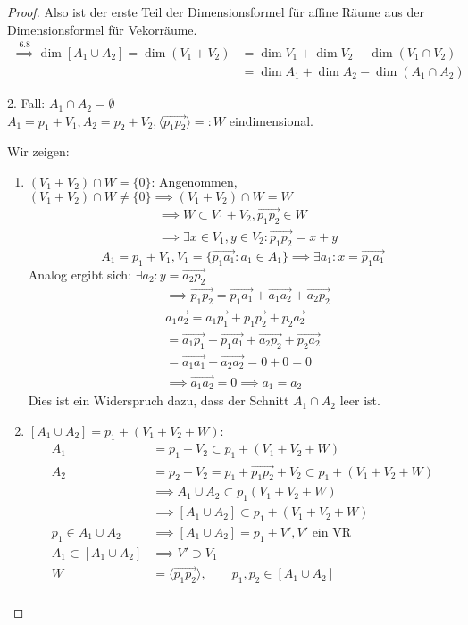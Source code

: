 \documentclass[a4paper, 10pt]{scrbook}
\begin{document}
\begin{thm}
\begin{proof}
Also ist der erste Teil der Dimensionsformel für affine Räume aus der Dimensionsformel für Vekorräume.
\begin{align*}
 \stackrel{6.8}\implies  \dim[A_1\cup A_2] = \dim(V_1 + V_2)&=\dim V_1+\dim V_2 - \dim(V_1\cap V_2)\\
&=\dim A_1 + \dim A_2 -\dim(A_1\cap A_2)
\end{align*}


2. Fall: $A_1\cap A_2=\emptyset$\\

$A_1=p_1+V_1,A_2=p_2+V_2,\langle\vec{p_1p_2}\rangle=:W$ eindimensional.

Wir zeigen:
\begin{enumerate} %
\item $(V_1+V_2)\cap W=\{0\}$:
Angenommen, $(V_1+V_2)\cap W\neq \{0\} \implies (V_1+V_2)\cap W=W$
\begin{align*}
&\implies W\subset V_1+V_2, \vec{p_1p_2}\in W \\
&\implies \exists x\in V_1, y\in V_2:\vec{p_1p_2}=x+y
\end{align*}
\[
A_1=p_1+V_1, V_1=\{\vec{p_1a_1}:a_1\in A_1\} \implies \exists a_1:x=\vec{p_1a_1}
\]
Analog ergibt sich: $ \exists a_2: y= \vec{a_2p_2}$
\begin{align*}
&\implies \vec{p_1p_2}=\vec{p_1a_1}+\vec{a_1a_2}+\vec{a_2p_2} \\
&\vec{a_1a_2}=\vec{a_1p_1}+\vec{p_1p_2}+\vec{p_2a_2} \\
&=\vec{a_1p_1}+\vec{p_1a_1}+\vec{a_2p_2}+\vec{p_2a_2} \\
&=\vec{a_1a_1}+\vec{a_2a_2}=0+0=0\\
&\implies\vec{a_1a_2}=0 \implies a_1=a_2
\end{align*}
Dies ist ein Widerspruch dazu, dass der Schnitt $A_1 \cap A_2$ leer ist.
\item $[A_1\cup A_2]=p_1+(V_1+V_2+W)$:
\begin{align*}
A_1&=p_1+V_2\subset p_1+(V_1+V_2+W)\\
A_2&=p_2+V_2=p_1+\vec{p_1p_2}+V_2\subset p_1+(V_1+V_2+W)\\
&\implies A_1\cup A_2\subset p_1(V_1+V_2+W)\\
&\implies [A_1\cup A_2]\subset p_1+(V_1+V_2+W)\\
p_1\in{A_1\cup A_2}&\implies[A_1\cup A_2]=p_1+V', V' \text{ ein VR}\\
A_1\subset[A_1\cup A_2] &\implies V'\supset V_1\\
W&=\langle\vec{p_1p_2}\rangle, \qquad p_1,p_2\in[A_1\cup A_2]\\

\end{align*}
\end{enumerate}
\end{proof}
\end{thm}
\end{document}
